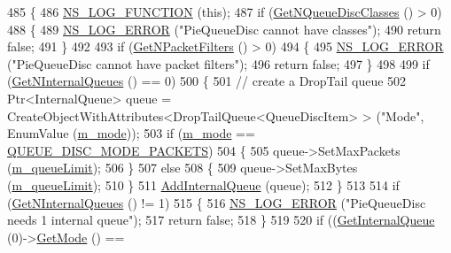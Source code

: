 \begin{DoxyCode}
485 \{
486   \hyperlink{log-macros-disabled_8h_a90b90d5bad1f39cb1b64923ea94c0761}{NS\_LOG\_FUNCTION} (\textcolor{keyword}{this});
487   \textcolor{keywordflow}{if} (\hyperlink{classns3_1_1QueueDisc_a8165c6afde992b073bc4d3bb283ed138}{GetNQueueDiscClasses} () > 0)
488     \{
489       \hyperlink{group__logging_ga0261a8db1d4ac5f79417d117634fd455}{NS\_LOG\_ERROR} (\textcolor{stringliteral}{"PieQueueDisc cannot have classes"});
490       \textcolor{keywordflow}{return} \textcolor{keyword}{false};
491     \}
492 
493   \textcolor{keywordflow}{if} (\hyperlink{classns3_1_1QueueDisc_aff24dd5be3fe3aa46b88c00659e09b23}{GetNPacketFilters} () > 0)
494     \{
495       \hyperlink{group__logging_ga0261a8db1d4ac5f79417d117634fd455}{NS\_LOG\_ERROR} (\textcolor{stringliteral}{"PieQueueDisc cannot have packet filters"});
496       \textcolor{keywordflow}{return} \textcolor{keyword}{false};
497     \}
498 
499   \textcolor{keywordflow}{if} (\hyperlink{classns3_1_1QueueDisc_a98e658dc1b0b32104ffc9e07afd205c6}{GetNInternalQueues} () == 0)
500     \{
501       \textcolor{comment}{// create a DropTail queue}
502       Ptr<InternalQueue> queue = CreateObjectWithAttributes<DropTailQueue<QueueDiscItem> > (\textcolor{stringliteral}{"Mode"}, 
      EnumValue (\hyperlink{classns3_1_1PieQueueDisc_ad3e0fb992a133e8dcd1e0937a156ff2b}{m\_mode}));
503       \textcolor{keywordflow}{if} (\hyperlink{classns3_1_1PieQueueDisc_ad3e0fb992a133e8dcd1e0937a156ff2b}{m\_mode} == \hyperlink{classns3_1_1PieQueueDisc_af026730ff1c04dd9bdf74b1797ae2ac4af556e8533dede431ff4553fe631883dc}{QUEUE\_DISC\_MODE\_PACKETS})
504         \{
505           queue->SetMaxPackets (\hyperlink{classns3_1_1PieQueueDisc_ad5a24ff6288913559429261d124db5eb}{m\_queueLimit});
506         \}
507       \textcolor{keywordflow}{else}
508         \{
509           queue->SetMaxBytes (\hyperlink{classns3_1_1PieQueueDisc_ad5a24ff6288913559429261d124db5eb}{m\_queueLimit});
510         \}
511       \hyperlink{classns3_1_1QueueDisc_a0599223e2a3976ef042a56c2923a2b61}{AddInternalQueue} (queue);
512     \}
513 
514   \textcolor{keywordflow}{if} (\hyperlink{classns3_1_1QueueDisc_a98e658dc1b0b32104ffc9e07afd205c6}{GetNInternalQueues} () != 1)
515     \{
516       \hyperlink{group__logging_ga0261a8db1d4ac5f79417d117634fd455}{NS\_LOG\_ERROR} (\textcolor{stringliteral}{"PieQueueDisc needs 1 internal queue"});
517       \textcolor{keywordflow}{return} \textcolor{keyword}{false};
518     \}
519 
520   \textcolor{keywordflow}{if} ((\hyperlink{classns3_1_1QueueDisc_adf09b498c07c5677c26ea4b8309def74}{GetInternalQueue} (0)->\hyperlink{classns3_1_1PieQueueDisc_a13bb54f830216e6d8e114abe3b4b04be}{GetMode} () == 

\end{DoxyCode}
